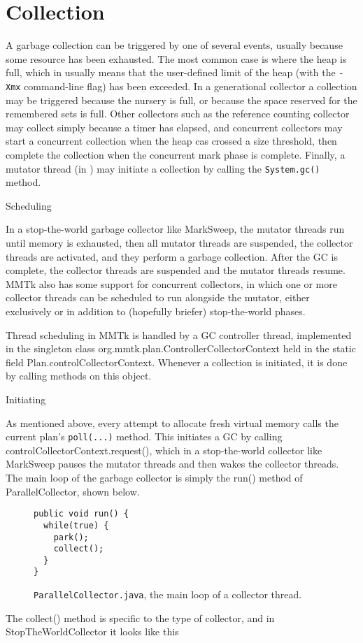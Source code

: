 \section{Collection}

A garbage collection can be triggered by one of several events, usually 
because some resource has been exhausted.  The most common case is where
the heap is full, which in \java usually means that the user-defined limit
of the heap (with the \lstinline|-Xmx| command-line flag) has been exceeded.
In a generational collector a collection may be triggered because the nursery
is full, or because the space reserved for the remembered sets is full.
Other collectors such as the reference counting collector may collect simply
because a timer has elapsed, and concurrent collectors may start a concurrent
collection when the heap cas crossed a size threshold, then complete the
collection when the concurrent mark phase is complete.  Finally, a mutator
thread (in \java) may initiate a collection by calling the
\lstinline|System.gc()| method.


Scheduling

In a stop-the-world garbage collector like MarkSweep, the mutator threads run until memory is exhausted, then all mutator threads are suspended, the collector threads are activated, and they perform a garbage collection.  After the GC is complete, the collector threads are suspended and the mutator threads resume.  MMTk also has some support for concurrent collectors, in which one or more collector threads can be scheduled to run alongside the mutator, either exclusively or in addition to (hopefully briefer) stop-the-world phases. 

Thread scheduling in MMTk is handled by a GC controller thread, implemented in the singleton class org.mmtk.plan.ControllerCollectorContext  held in the static field Plan.controlCollectorContext. Whenever a collection is initiated, it is done by calling methods on this object.

Initiating

As mentioned above, every attempt to allocate fresh virtual memory calls the 
current plan's \lstinline|poll(...)| method.  This initiates a GC by calling
controlCollectorContext.request(), which in a stop-the-world collector like 
MarkSweep pauses the mutator threads and then wakes the collector threads.  
The main loop of the garbage collector is simply the run() method of ParallelCollector, shown below.

\begin{figure}[h]
\begin{lstlisting}
public void run() {
  while(true) {
    park();
    collect();
  }
}
\end{lstlisting}
\caption{\lstinline|ParallelCollector.java|, the main loop of a collector
thread.}
\label{fig:gc:collector-run}
\end{figure}
The collect() method is specific to the type of collector, and in StopTheWorldCollector it looks like this

